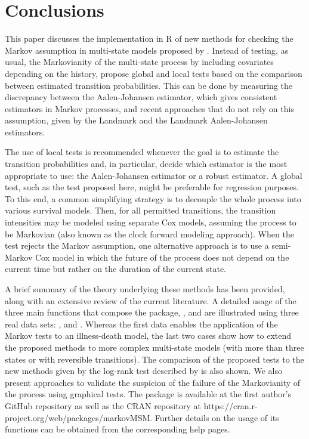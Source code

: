 \section{Conclusions} \label{sec:conc}
This paper discusses the implementation in R of new methods for checking the Markov assumption in multi-state models proposed by \cite{soutinho_machado2020}. Instead of testing, as usual, the Markovianity of the multi-state process by including covariates depending on the history, \cite{soutinho_machado2020} propose global and local tests based on the comparison between estimated transition probabilities. This can be done by measuring the discrepancy between the Aalen-Johansen estimator, which gives consistent estimators in Markov processes, and recent approaches that do not rely on this assumption, given by the Landmark and the Landmark Aalen-Johansen estimators. 

The use of local tests is recommended whenever the goal is to estimate the transition probabilities and, in particular, decide which estimator is the most appropriate to use: the Aalen-Johansen estimator or a robust estimator. A global test, such as the test proposed here, might be preferable for regression purposes. To this end, a common simplifying strategy is to decouple the whole process into various survival models. Then, for all permitted transitions, the transition intensities may be modeled using separate Cox models, assuming the process to be Markovian (also known as the clock forward modeling approach). When the test rejects the Markov assumption, one alternative approach is to use a semi-Markov Cox model in which the future of the process does not depend on the current time but rather on the duration of the current state.

A brief summary of the theory underlying these methods has been provided, along with an extensive review of the current literature. A detailed usage of the three main functions that compose the  package, ,  and  are illustrated using three real data sets: ,  and . Whereas the first data enables the application of the Markov tests to an illness-death model, the last two cases show how to extend the proposed methods to more complex multi-state models (with more than three states or with reversible transitions). The comparison of the proposed tests to the new methods given by the log-rank test described by \cite{Titman2020} is also shown. We also present approaches to validate the suspicion of the failure of the Markovianity of the process using graphical tests. The  package is available at the first author's GitHub repository as well as the CRAN repository at https://cran.r-project.org/web/packages/markovMSM. Further details on the usage of its functions can be obtained from the corresponding help pages.


